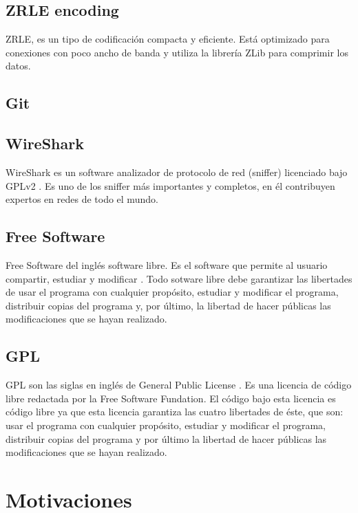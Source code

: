 \subsection{ZRLE encoding}

ZRLE, es un tipo de codificación compacta y eficiente. Está optimizado para conexiones con poco ancho de banda y utiliza la librería ZLib para comprimir los datos.

\subsection{Git}



\subsection{WireShark}

WireShark es un software analizador de protocolo de red (sniffer) licenciado bajo GPLv2 \cite{wiresharkpage:wireshark}. Es uno de los sniffer más importantes y completos, en él contribuyen expertos en redes de todo el mundo.

\subsection{Free Software}

Free Software del inglés software libre. Es el software que permite al usuario compartir, estudiar y modificar \cite{FSpage:FS}. Todo sotware libre debe garantizar las libertades de usar el programa con cualquier propósito, estudiar y modificar el programa, distribuir copias del programa y, por último, la libertad de hacer públicas las modificaciones que se hayan realizado.

\subsection{GPL}

GPL son las siglas en inglés de General Public License \cite{GPLpage:GPL}. Es una licencia de código libre redactada por la Free Software Fundation. El código bajo esta licencia es código libre ya que esta licencia garantiza las cuatro libertades de éste, que son: usar el programa con cualquier propósito, estudiar y modificar el programa, distribuir copias del programa y por último la libertad de hacer públicas las modificaciones que se hayan realizado.
\newpage
\section{Motivaciones}

